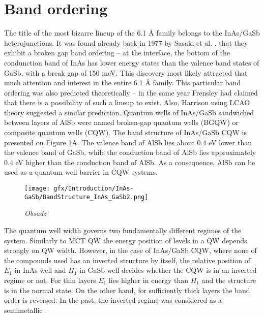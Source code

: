 \documentclass[titlepage,a4paper]{book}
\begin{document}
\section{Band ordering}
The title of the most bizarre lineup of the 6.1 Å family belongs to the InAs/GaSb heterojunctions. It was found already back in 1977 by Sasaki et al. \cite{Sasaki_BandOrdering}, that they exhibit a broken gap band ordering -- at the interface, the bottom of the condunction band of InAs has lower energy states than the valence band states of GaSb, with a break gap of 150 meV. This discovery most likely attracted that much attention and interest in the entire 6.1 Å family. This particular band ordering was also predicted theoretically -- in the same year Frensley \cite{Frensley_BandOrdering} had claimed that there is a possibility of such a lineup to exist. Also, Harrison using LCAO theory \cite{Harrison_BandOrdering} suggested a similar prediction. Quantum wells of InAs/GaSb sandwiched between layers of AlSb were named broken-gap quantum wells (BGQW) or composite quantum wells (CQW). The band structure of InAs/GaSb CQW is presented on Figure \ref{fig:BandStructure_InAs_GaSb2}A. The valence band of AlSb lies about 0.4 eV lower than the valence band of GaSb, while the conduction band of AlSb lies approximately 0.4 eV higher than the conduction band of AlSb. As a consequence, AlSb can be used as a quantum well barrier in CQW systems.

\begin{figure}[ht]
	\centering
	\texttt{[image: gfx/Introduction/InAs-GaSb/BandStructure\_InAs\_GaSb2.png]}
	\vspace{-10pt}
	\caption{\textit{Obsadz}}
	\label{fig:BandStructure_InAs_GaSb2}
\end{figure} 

The quantum well width governs two fundamentally different regimes of the system. Similarly to MCT QW the energy position of levels in a QW depends strongly on QW width. However, in the case of InAs/GaSb CQW, where none of the compounds used has an inverted structure by itself, the relative position of $E_1$ in InAs well and $H_1$ in GaSb well decides whether the CQW is in an inverted regime or not. For thin layers $E_1$ lies higher in energy than $H_1$ and the structure is in the normal state. On the other hand, for sufficiently thick layers the band order is reversed. In the past, the inverted regime was considered as a semimetallic \cite{Chang_BandStructure}. 
\end{document}
